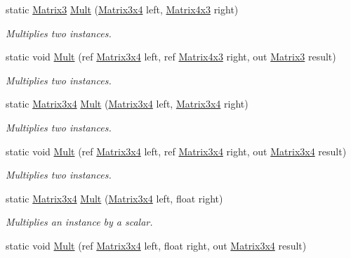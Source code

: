 \begin{DoxyCompactItemize}
static \hyperlink{struct_open_t_k_1_1_matrix3}{Matrix3} \hyperlink{struct_open_t_k_1_1_matrix3x4_a8f9f840e46e77372ae294d4d7f23d819}{Mult} (\hyperlink{struct_open_t_k_1_1_matrix3x4}{Matrix3x4} left, \hyperlink{struct_open_t_k_1_1_matrix4x3}{Matrix4x3} right)
\begin{DoxyCompactList}\small\item\em Multiplies two instances. \end{DoxyCompactList}\item 
static void \hyperlink{struct_open_t_k_1_1_matrix3x4_aa50dfbda08d9475411c729af0584b50a}{Mult} (ref \hyperlink{struct_open_t_k_1_1_matrix3x4}{Matrix3x4} left, ref \hyperlink{struct_open_t_k_1_1_matrix4x3}{Matrix4x3} right, out \hyperlink{struct_open_t_k_1_1_matrix3}{Matrix3} result)
\begin{DoxyCompactList}\small\item\em Multiplies two instances. \end{DoxyCompactList}\item 
static \hyperlink{struct_open_t_k_1_1_matrix3x4}{Matrix3x4} \hyperlink{struct_open_t_k_1_1_matrix3x4_a29c3b00c55e88712f8ceb4f20c048f87}{Mult} (\hyperlink{struct_open_t_k_1_1_matrix3x4}{Matrix3x4} left, \hyperlink{struct_open_t_k_1_1_matrix3x4}{Matrix3x4} right)
\begin{DoxyCompactList}\small\item\em Multiplies two instances. \end{DoxyCompactList}\item 
static void \hyperlink{struct_open_t_k_1_1_matrix3x4_a558fe422bf71b26b674130be1b56e368}{Mult} (ref \hyperlink{struct_open_t_k_1_1_matrix3x4}{Matrix3x4} left, ref \hyperlink{struct_open_t_k_1_1_matrix3x4}{Matrix3x4} right, out \hyperlink{struct_open_t_k_1_1_matrix3x4}{Matrix3x4} result)
\begin{DoxyCompactList}\small\item\em Multiplies two instances. \end{DoxyCompactList}\item 
static \hyperlink{struct_open_t_k_1_1_matrix3x4}{Matrix3x4} \hyperlink{struct_open_t_k_1_1_matrix3x4_adbfd32a0ebd9236e1c05648d3b14c74e}{Mult} (\hyperlink{struct_open_t_k_1_1_matrix3x4}{Matrix3x4} left, float right)
\begin{DoxyCompactList}\small\item\em Multiplies an instance by a scalar. \end{DoxyCompactList}\item 
static void \hyperlink{struct_open_t_k_1_1_matrix3x4_aca41cef23a9b9e41273d1e8915b398b0}{Mult} (ref \hyperlink{struct_open_t_k_1_1_matrix3x4}{Matrix3x4} left, float right, out \hyperlink{struct_open_t_k_1_1_matrix3x4}{Matrix3x4} result)

\end{DoxyCompactItemize}
